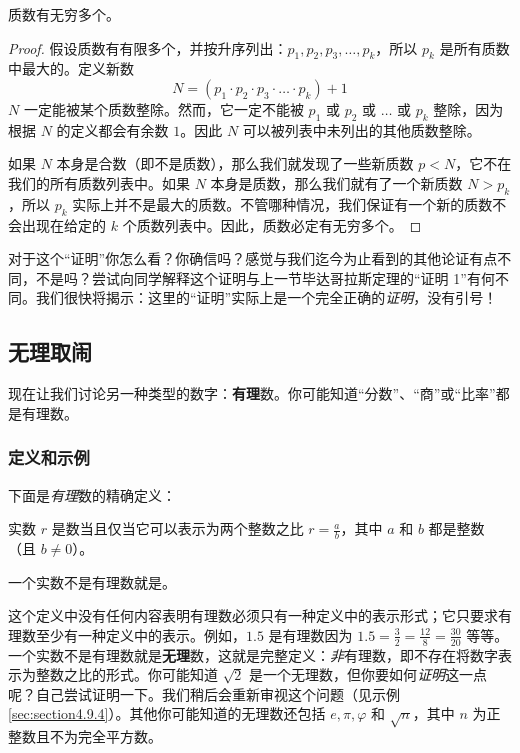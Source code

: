 \begin{theorem}[质数无限性]
    质数有无穷多个。
\end{theorem}

\begin{proof}
    假设质数有有限多个，并按升序列出：$p_1, p_2, p_3, \dots, p_k$，所以 $p_k$ 是所有质数中最大的。定义新数
    \[N = (p_1 \cdot p_2 \cdot p_3 \cdot \dots \cdot p_k) + 1\]
    $N$ 一定能被某个质数整除。然而，它一定不能被 $p_1$ 或 $p_2$ 或 $\dots$ 或 $p_k$ 整除，因为根据 $N$ 的定义都会有余数 $1$。因此 $N$ 可以被列表中未列出的其他质数整除。

    如果 $N$ 本身是合数（即不是质数），那么我们就发现了一些新质数 $p < N$，它不在我们的所有质数列表中。如果 $N$ 本身是质数，那么我们就有了一个新质数 $N > p_k$，所以 $p_k$ 实际上并不是最大的质数。不管哪种情况，我们保证有一个新的质数不会出现在给定的 $k$ 个质数列表中。因此，质数必定有无穷多个。
\end{proof}

对于这个``证明''你怎么看？你确信吗？感觉与我们迄今为止看到的其他论证有点不同，不是吗？尝试向同学解释这个证明与上一节毕达哥拉斯定理的``证明 1''有何不同。我们很快将揭示：这里的``证明''实际上是一个完全正确的\emph{证明}，没有引号！
    
\subsection{无理取闹}

现在让我们讨论另一种类型的数字：\textbf{有理}数。你可能知道``分数''、``商''或``比率''都是有理数。

\subsubsection*{定义和示例}

下面是\emph{有理}数的精确定义：

\begin{definition}
    实数 $r$ 是数当且仅当它可以表示为两个整数之比 $r = \frac{a}{b}$，其中 $a$ 和 $b$ 都是整数（且 $b \ne 0$）。

    一个实数不是有理数就是。
\end{definition}

这个定义中没有任何内容表明有理数必须只有一种定义中的表示形式；它只要求有理数至少有一种定义中的表示。例如，$1.5$ 是有理数因为 $1.5 = \frac{3}{2} = \frac{12}{8} = \frac{30}{20}$ 等等。一个实数不是有理数就是\textbf{无理}数，这就是完整定义：\emph{非}有理数，即不存在将数字表示为整数之比的形式。你可能知道 $\sqrt{2}$ 是一个无理数，但你要如何\emph{证明}这一点呢？自己尝试证明一下。我们稍后会重新审视这个问题（见示例 \ref{sec:section4.9.4}）。其他你可能知道的无理数还包括 $e, \pi, \varphi$ 和 $\sqrt{n}$，其中 $n$ 为正整数且不为完全平方数。

